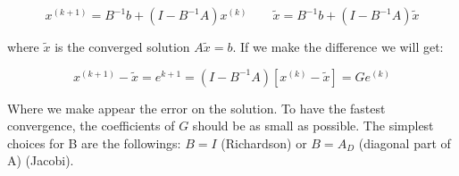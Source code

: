 \begin{equation}
x^{(k+1)} = B^{-1}b + (I - B^{-1}A) x^{(k)}\qquad 
\tilde{x} = B^{-1}b + (I - B^{-1}A) \tilde{x}
\end{equation}

where $\tilde{x}$ is the converged solution $A\tilde{x}=b$. If we make the difference we will get: 

\begin{equation}
x^{(k+1)}-\tilde{x} = e^{k+1} = (I - B^{-1}A)[x^{(k)}-\tilde{x}] = Ge^{(k)}
\end{equation}

Where we make appear the error on the solution. To have the fastest convergence, the coefficients of $G$ should be as small as possible. The simplest choices for B are the followings: $B=I$ (Richardson) or $B=A_{D}$ (diagonal part of A) (Jacobi). 


